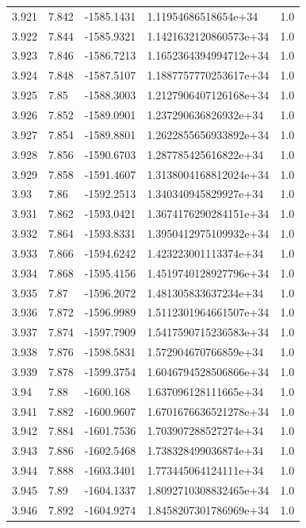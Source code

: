 \begin{tabular}{lllll}
3.921 & 7.842 & -1585.1431 & 1.11954686518654e+34 & 1.0 \\
3.922 & 7.844 & -1585.9321 & 1.1421632120860573e+34 & 1.0 \\
3.923 & 7.846 & -1586.7213 & 1.1652364394994712e+34 & 1.0 \\
3.924 & 7.848 & -1587.5107 & 1.1887757770253617e+34 & 1.0 \\
3.925 & 7.85 & -1588.3003 & 1.2127906407126168e+34 & 1.0 \\
3.926 & 7.852 & -1589.0901 & 1.237290636826932e+34 & 1.0 \\
3.927 & 7.854 & -1589.8801 & 1.2622855656933892e+34 & 1.0 \\
3.928 & 7.856 & -1590.6703 & 1.287785425616822e+34 & 1.0 \\
3.929 & 7.858 & -1591.4607 & 1.3138004168812024e+34 & 1.0 \\
3.93 & 7.86 & -1592.2513 & 1.340340945829927e+34 & 1.0 \\
3.931 & 7.862 & -1593.0421 & 1.3674176290284151e+34 & 1.0 \\
3.932 & 7.864 & -1593.8331 & 1.3950412975109932e+34 & 1.0 \\
3.933 & 7.866 & -1594.6242 & 1.423223001113374e+34 & 1.0 \\
3.934 & 7.868 & -1595.4156 & 1.4519740128927796e+34 & 1.0 \\
3.935 & 7.87 & -1596.2072 & 1.481305833637234e+34 & 1.0 \\
3.936 & 7.872 & -1596.9989 & 1.5112301964661507e+34 & 1.0 \\
3.937 & 7.874 & -1597.7909 & 1.5417590715236583e+34 & 1.0 \\
3.938 & 7.876 & -1598.5831 & 1.572904670766859e+34 & 1.0 \\
3.939 & 7.878 & -1599.3754 & 1.6046794528506866e+34 & 1.0 \\
3.94 & 7.88 & -1600.168 & 1.637096128111665e+34 & 1.0 \\
3.941 & 7.882 & -1600.9607 & 1.6701676636521278e+34 & 1.0 \\
3.942 & 7.884 & -1601.7536 & 1.703907288527274e+34 & 1.0 \\
3.943 & 7.886 & -1602.5468 & 1.738328499036874e+34 & 1.0 \\
3.944 & 7.888 & -1603.3401 & 1.773445064124111e+34 & 1.0 \\
3.945 & 7.89 & -1604.1337 & 1.8092710308832465e+34 & 1.0 \\
3.946 & 7.892 & -1604.9274 & 1.8458207301786969e+34 & 1.0 \\

\end{tabular}

